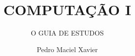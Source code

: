 \documentclass[br, dark]{textbook}
\title{COMPUTAÇÃO I}
\author{Pedro Maciel Xavier}
\subtitle{O GUIA DE ESTUDOS}
\begin{document}
    \frontmatter
    \titlepage
    
    
    \titlepage

    \mainmatter
    \tableofcontents
    

    \backmatter
    \appendix
    
    
\end{document}
